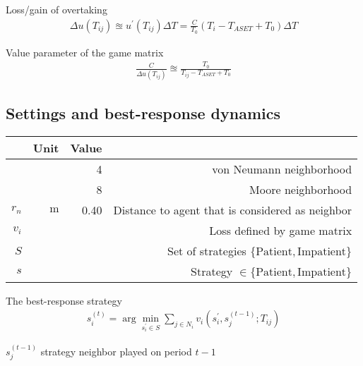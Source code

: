 Loss/gain of overtaking
\begin{align}
\Delta u(T_{ij}) \approxeq u^{\prime}(T_{ij}) \Delta T = \frac{C}{T_{0}} \left(T_{i} - T_{ASET} + T_{0}\right) \Delta T
\end{align}

Value parameter of the game matrix
\begin{align}
\frac{C}{\Delta u(T_{ij})} \approxeq \frac{T_{0}}{T_{ij} - T_{ASET} + T_{0}}
\end{align}

\subsection{Settings and best-response dynamics}
\begin{table}[H]
\begin{tabularx}{1.0\linewidth}{ r r r R }
 & Unit & Value &  \\
\hline
\hline
 & & 4 & von Neumann neighborhood \\
 & & 8 & Moore neighborhood \\
$ r_{n} $ & $ \mathrm{m} $ & 0.40 & Distance to agent that is considered as neighbor \\
$ v_{i} $ & & & Loss defined by game matrix \\
$ S $ &&& Set of strategies $ \{\mathrm{Patient}, \mathrm{Impatient}\} $ \\
$ s $ &&& Strategy $ \in \{\mathrm{Patient}, \mathrm{Impatient}\} $ \\
\end{tabularx}
\end{table}

The best-response strategy
\begin{align}
s_{i}^{(t)} = \arg\min_{s_{i}^{\prime}\in S} \sum_{j\in N_{i}} v_{i} \left(s_{i}^{\prime}, s_{j}^{(t-1)} ; T_{ij} \right)
\end{align}

$ s_{j}^{(t-1)} $ strategy neighbor played on period $ t-1 $


